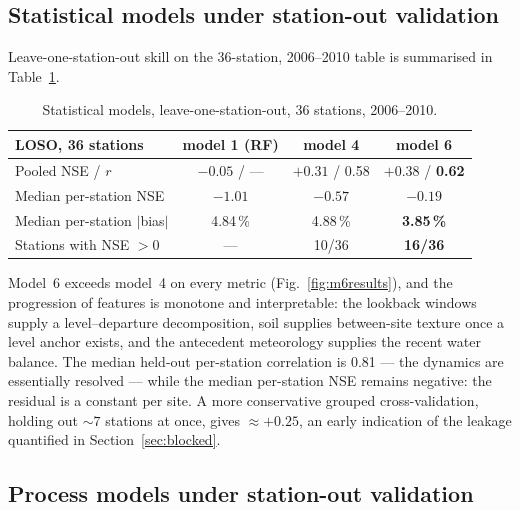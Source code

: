 \documentclass[11pt,a4paper]{article}
\begin{document}
\subsection{Statistical models under station-out validation}\label{sec:ml-loso}

Leave-one-station-out skill on the 36-station, 2006--2010 table is summarised
in Table~\ref{tab:ml-loso}.

\begin{table}[htbp]
\centering
\caption{Statistical models, leave-one-station-out, 36 stations, 2006--2010.}
\label{tab:ml-loso}
\small
\begin{tabular}{lccc}
\toprule
LOSO, 36 stations & model 1 (RF) & model 4 & \textbf{model 6} \\
\midrule
Pooled NSE / $r$              & $-0.05$ / ---   & $+0.31$ / 0.58 & $\mathbf{+0.38}$ / \textbf{0.62} \\
Median per-station NSE        & $-1.01$        & $-0.57$        & $\mathbf{-0.19}$ \\
Median per-station $|$bias$|$ & 4.84\,\%       & 4.88\,\%       & \textbf{3.85\,\%} \\
Stations with NSE $> 0$       & ---            & 10/36          & \textbf{16/36} \\
\bottomrule
\end{tabular}
\end{table}

Model~6 exceeds model~4 on every metric (Fig.~\ref{fig:m6results}), and the
progression of features is monotone and interpretable: the lookback windows
supply a level--departure decomposition, soil supplies between-site texture
once a level anchor exists, and the antecedent meteorology supplies the recent
water balance. The median held-out per-station correlation is 0.81 --- the
dynamics are essentially resolved --- while the median per-station NSE remains
negative: the residual is a constant per site. A more conservative grouped
cross-validation, holding out ${\sim}7$ stations at once, gives
${\approx}+0.25$, an early indication of the leakage quantified in
Section~\ref{sec:blocked}.

\subsection{Process models under station-out validation}\label{sec:proc-loso}
\end{document}
